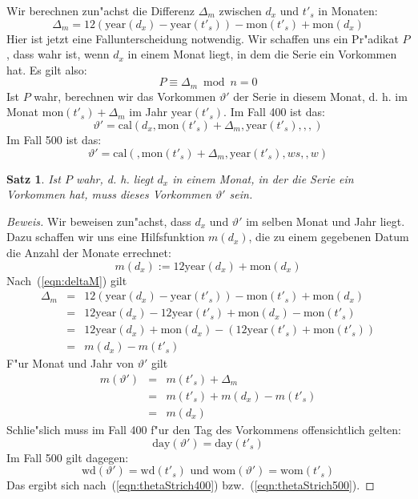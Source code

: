 \documentclass[a4paper]{article}
\newcommand*{\dayf}{\mathrm{day}}
\newcommand*{\monf}{\mathrm{mon}}
\newcommand*{\yearf}{\mathrm{year}}
\newcommand*{\wdf}{\mathrm{wd}}
\newcommand*{\womf}{\mathrm{wom}}
\newcommand*{\calf}{\mathrm{cal}}
\numberwithin{equation}{section}
\newtheorem{thm}{Satz}
\begin{document}
Wir berechnen zun"achst die Differenz $\Delta_m$ zwischen $d_x$ und $t'_s$ in
Monaten:
\begin{equation}\label{eqn:deltaM}
  \Delta_m = 12 (\yearf(d_x)-\yearf(t'_s)) - \monf(t'_s) + \monf(d_x)
\end{equation}
Hier ist jetzt eine Fallunterscheidung notwendig. Wir schaffen uns ein Pr"adikat
$P$, dass wahr ist, wenn $d_x$ in einem Monat liegt, in dem die Serie ein
Vorkommen hat. Es gilt also:
\begin{equation}P \equiv \Delta_m \bmod n = 0\end{equation}
Ist $P$ wahr, berechnen wir das Vorkommen $\vartheta'$ der Serie in diesem
Monat, d. h. im Monat $\monf(t'_s) + \Delta_m$ im Jahr $\yearf(t'_s)$. Im Fall
400 ist das:
\begin{equation}\label{eqn:thetaStrich400}
  \vartheta' = \calf(d_x, \monf(t'_s) + \Delta_m, \yearf(t'_s), , , )
\end{equation}
Im Fall 500 ist das:
\begin{equation}\label{eqn:thetaStrich500}
  \vartheta' = \calf(, \monf(t'_s) + \Delta_m, \yearf(t'_s), ws, , w)
\end{equation}
\begin{thm}
Ist $P$ wahr, d. h. liegt $d_x$ in einem Monat, in der die Serie ein Vorkommen
hat, muss dieses Vorkommen $\vartheta'$ sein.
\end{thm}
\begin{proof}[Beweis]
Wir beweisen zun"achst, dass $d_x$ und $\vartheta'$ im selben Monat und Jahr
liegt. Dazu schaffen wir uns eine Hilfsfunktion $m(d_x)$, die zu einem gegebenen
Datum die Anzahl der Monate errechnet:
\begin{equation}m(d_x) := 12\yearf(d_x) + \monf(d_x)\end{equation}
Nach~(\ref{eqn:deltaM}) gilt
\begin{eqnarray}
  \Delta_m & = & 12 (\yearf(d_x)-\yearf(t'_s)) - \monf(t'_s) + \monf(d_x) \\
    & = & 12\yearf(d_x) - 12\yearf(t'_s) + \monf(d_x) - \monf(t'_s) \\
    & = & 12\yearf(d_x) + \monf(d_x) - (12\yearf(t'_s) + \monf(t'_s)) \\
    & = & m(d_x) - m(t'_s)
\end{eqnarray}
F"ur Monat und Jahr von $\vartheta'$ gilt
\begin{eqnarray}
  m(\vartheta') & = & m(t'_s) + \Delta_m \\
    & = & m(t'_s) + m(d_x) - m(t'_s) \\
    & = & m(d_x)
\end{eqnarray}
Schlie"slich muss im Fall 400 f"ur den Tag des Vorkommens offensichtlich gelten:
\begin{equation}\dayf(\vartheta') = \dayf(t'_s)\end{equation}
Im Fall 500 gilt dagegen:
\begin{equation}
  \wdf(\vartheta') = \wdf(t'_s) \textrm{ und } \womf(\vartheta') = \womf(t'_s)
\end{equation}
Das ergibt sich nach~(\ref{eqn:thetaStrich400}) bzw.~(\ref{eqn:thetaStrich500}).
\end{proof}
\end{document}
